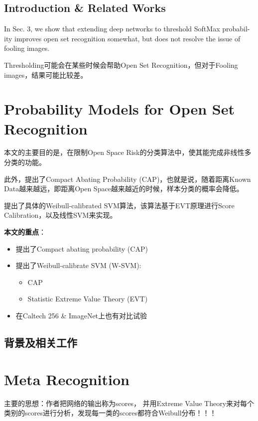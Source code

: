 \subsection{Introduction \& Related Works}

In Sec. 3, we show that
extending deep networks to threshold SoftMax probabil-
ity improves open set recognition somewhat, but does not
resolve the issue of fooling images.

Thresholding可能会在某些时候会帮助Open Set Recognition，但对于Fooling images，结果可能比较差。

\section{Probability Models for Open Set Recognition}

本文的主要目的是，在限制Open Space Risk的分类算法中，使其能完成非线性多分类的功能。

此外，提出了Compact Abating Probability (CAP)，也就是说，随着距离Known Data越来越远，即距离Open Space越来越近的时候，样本分类的概率会降低。

提出了具体的Weibull-calibrated SVM算法，该算法基于EVT原理进行Score Calibration，以及线性SVM来实现。

\textbf{本文的重点}：
\begin{itemize}
\item 提出了Compact abating probability (CAP)
\item 提出了Weibull-calibrate SVM (W-SVM):
\begin{itemize}
\item CAP
\item Statistic Extreme Value Theory (EVT)
\end{itemize}
\item 在Caltech 256 \& ImageNet上也有对比试验
\end{itemize}

\subsection{背景及相关工作}


\section{Meta Recognition}

主要的思想：作者把网络的输出称为scores， 并用Extreme Value Theory来对每个类别的scores进行分析，发现每一类的scores都符合Weibull分布！！！

